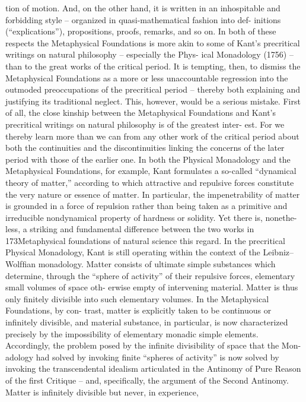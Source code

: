 tion of motion. And, on the other hand, it is written in an inhospitable
and forbidding style – organized in quasi-mathematical fashion into def-
initions (“explications”), propositions, proofs, remarks, and so on. In
both of these respects the Metaphysical Foundations is more akin to some
of Kant’s precritical writings on natural philosophy – especially the Phys-
ical Monadology (1756) – than to the great works of the critical period.
It is tempting, then, to dismiss the Metaphysical Foundations as a more or
less unaccountable regression into the outmoded preoccupations of the
precritical period – thereby both explaining and justifying its traditional
neglect. This, however, would be a serious mistake.
First of all, the close kinship between the Metaphysical Foundations and
Kant’s precritical writings on natural philosophy is of the greatest inter-
est. For we thereby learn more than we can from any other work of the
critical period about both the continuities and the discontinuities linking
the concerns of the later period with those of the earlier one. In both
the Physical Monadology and the Metaphysical Foundations, for example,
Kant formulates a so-called “dynamical theory of matter,” according to
which attractive and repulsive forces constitute the very nature or essence
of matter. In particular, the impenetrability of matter is grounded in a
force of repulsion rather than being taken as a primitive and irreducible
nondynamical property of hardness or solidity. Yet there is, nonethe-
less, a striking and fundamental difference between the two works in
173Metaphysical foundations of natural science
this regard. In the precritical Physical Monadology, Kant is still operating
within the context of the Leibniz–Wolfﬁan monadology. Matter consists
of ultimate simple substances which determine, through the “sphere of
activity” of their repulsive forces, elementary small volumes of space oth-
erwise empty of intervening material. Matter is thus only ﬁnitely divisible
into such elementary volumes. In the Metaphysical Foundations, by con-
trast, matter is explicitly taken to be continuous or inﬁnitely divisible,
and material substance, in particular, is now characterized precisely by
the impossibility of elementary monadic simple elements. Accordingly,
the problem posed by the inﬁnite divisibility of space that the Mon-
adology had solved by invoking ﬁnite “spheres of activity” is now solved
by invoking the transcendental idealism articulated in the Antinomy of
Pure Reason of the ﬁrst Critique – and, speciﬁcally, the argument of the
Second Antinomy. Matter is inﬁnitely divisible but never, in experience,
